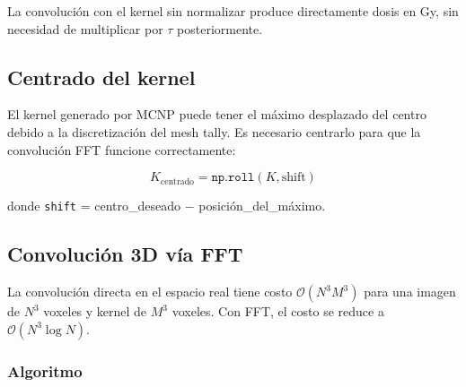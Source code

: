 \documentclass[12pt,a4paper]{article}
\begin{document}
La convolución con el kernel sin normalizar produce directamente dosis en Gy,
sin necesidad de multiplicar por $\tau$ posteriormente.

\subsection{Centrado del kernel}

El kernel generado por MCNP puede tener el máximo desplazado del centro
debido a la discretización del mesh tally. Es necesario centrarlo para
que la convolución FFT funcione correctamente:

\begin{equation}
    K_{\text{centrado}} = \texttt{np.roll}(K, \text{shift})
\end{equation}

donde \texttt{shift} = centro\_deseado $-$ posición\_del\_máximo.

\subsection{Convolución 3D vía FFT}

La convolución directa en el espacio real tiene costo
$\mathcal{O}(N^3 M^3)$ para una imagen de $N^3$ voxeles y kernel de
$M^3$ voxeles. Con FFT, el costo se reduce a
$\mathcal{O}(N^3 \log N)$.

\subsubsection{Algoritmo}
\end{document}
